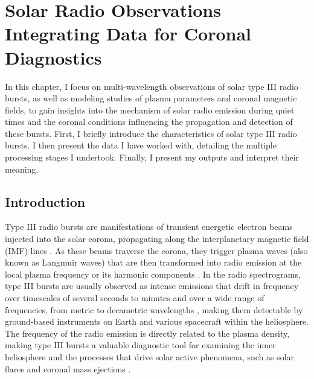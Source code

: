 \chapter[Solar Radio Observations: Integrating Data for Coronal Diagnostics]{Solar Radio Observations\\\LARGE Integrating Data for Coronal Diagnostics}
\label{chapter3}
In this chapter, I focus on multi-wavelength observations of solar type III radio bursts, as well as modeling studies of plasma parameters and coronal magnetic fields, to gain insights into the mechanism of solar radio emission during quiet times and the coronal conditions influencing the propagation and detection of these bursts. First, I briefly introduce the characteristics of solar type III radio bursts. I then present the data I have worked with, detailing the multiple processing stages I undertook. Finally, I present my outputs and interpret their meaning.
\section{Introduction}
Type III radio bursts are manifestations of transient energetic electron beams injected into the solar corona, propagating along the interplanetary magnetic field (IMF) lines \cite{ergun_1998, pick_radio_2006, reid_2020}. As these beams traverse the corona, they trigger plasma waves (also known as Langmuir waves) that are then transformed into radio emission at the local plasma frequency or its harmonic components \cite{melrose_2017}.
In the radio spectrograms, type III bursts are usually observed as intense emissions that drift in frequency over timescales of several seconds to minutes and over a wide range of frequencies, from metric to decametric wavelengths \cite{wild_1950a, lecacheux_1989, bonnin_2008}, making them detectable by ground-based instruments on Earth and various spacecraft within the heliosphere. 
The frequency of the radio emission is directly related to the plasma density, making type III bursts a valuable diagnostic tool for examining the inner heliosphere and the processes that drive solar active phenomena, such as solar flares and coronal mass ejections \cite{reid_2014, kontar_2017}.

